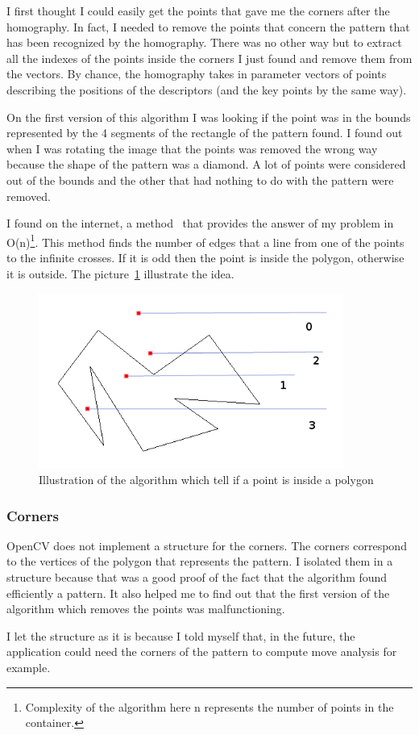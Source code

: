	\par I first thought I could easily get the points that gave me the corners after the homography. In fact, I needed to remove the points that concern the pattern that has been recognized by the homography. There was no other way but to extract all the indexes of the points inside the corners I just found and remove them from the vectors. By chance, the homography takes in parameter vectors of points describing the positions of the descriptors (and the key points by the same way). 
	\par On the first version of this algorithm I was looking if the point was in the bounds represented by the 4 segments of the rectangle of the pattern found. I found out when I was rotating the image that the points was removed the wrong way because the shape of the pattern was a diamond. A lot of points were considered out of the bounds and the other that had nothing to do with the pattern were removed.
	\par I found on the internet, a method~\cite{InOut} that provides the answer of my problem in O(n)\footnote{Complexity of the algorithm here n represents the number of points in the container.}. This method finds the number of edges that a line from one of the points to the infinite crosses. If it is odd then the point is inside the polygon, otherwise it is outside. The picture~\ref{OutIn} illustrate the idea.
	\begin{figure}[h]
		\begin{center}
			\includegraphics[width=10cm]{images_not_compressed/isIn.png}
			\caption{Illustration of the algorithm which tell if a point is inside a polygon}
			\label{OutIn}	
		\end{center}
	\end{figure}
	\subsubsection{Corners}
	\par OpenCV does not implement a structure for the corners. The corners correspond to the vertices of the polygon that represents the pattern. I isolated them in a structure because that was a good proof of the fact that the algorithm found efficiently a pattern. It also helped me to find out that the first version of the algorithm which removes the points was malfunctioning.
	\par I let the structure as it is because I told myself that, in the future, the application could need the corners of the pattern to compute move analysis for example. 	
	
